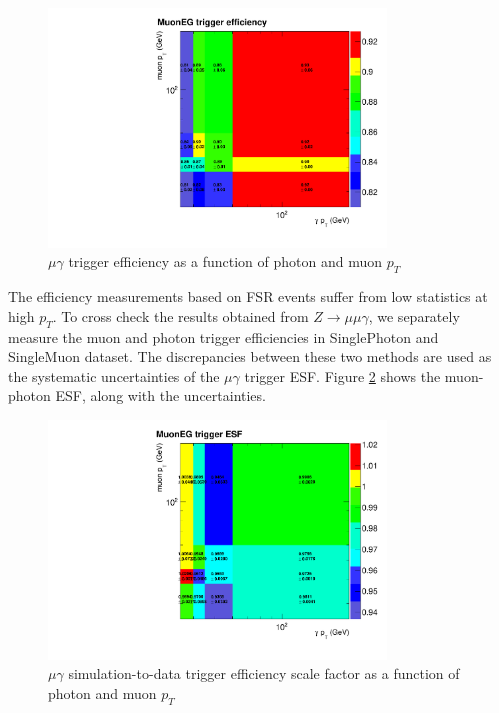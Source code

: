 \documentclass[thesis.tex]{subfiles}
\renewcommand\_{\textunderscore\allowbreak}
\begin{document}
\begin{figure}
 \centering
 \includegraphics[width=0.8\textwidth]{Figures/mgTrigger_efficiency.pdf}
  \caption{$\mu\gamma$ trigger efficiency as a function of photon and muon $p_{T}$ }
  \label{fig:mgtriggereff}
\end{figure}

The efficiency measurements based on FSR events suffer from low statistics at high $p_{T}$. To cross check the results obtained from $Z\rightarrow\mu\mu\gamma$, we separately measure the muon and photon trigger efficiencies in SinglePhoton and SingleMuon dataset. The discrepancies between these two methods are used as the systematic uncertainties of the $\mu\gamma$ trigger ESF. Figure \ref{fig:mgtriggerESF} shows the muon-photon ESF, along with the uncertainties. 


\begin{figure}
 \centering
 \includegraphics[width=0.8\textwidth]{Figures/mgTrigger_ESF.pdf}
  \caption{$\mu\gamma$ simulation-to-data trigger efficiency scale factor as a function of photon and muon $p_{T}$ }
  \label{fig:mgtriggerESF}
\end{figure}
\end{document}

